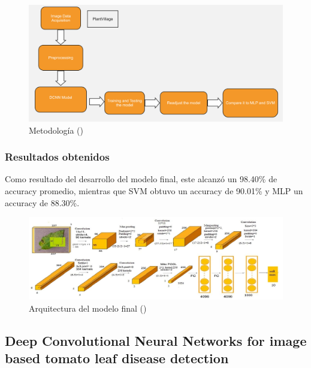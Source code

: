 \begin{figure}[H]
	\begin{center}
		\includegraphics[width=1\textwidth]{2/figures/ant5.jpg}
		\caption{Metodología (\cite{antecedente5})}
	\end{center}
\end{figure}

\subsubsection{Resultados obtenidos}
Como resultado del desarrollo del modelo final, este alcanzó un 98.40\% de accuracy promedio, mientras que SVM obtuvo un accuracy de 90.01\% y MLP un accuracy de 88.30\%. 

\begin{figure}[H]
	\begin{center}
		\includegraphics[width=1\textwidth]{2/figures/ant5.2.jpeg}
		\caption{Arquitectura del modelo final (\cite{antecedente5})}
	\end{center}
\end{figure}
\subsection{Deep Convolutional Neural Networks for image based tomato leaf disease detection  \citep*{antecedente6}}

